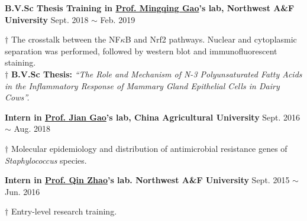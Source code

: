\vspace{5pt}


\textbf{B.V.Sc Thesis Training in \href{https://faculty.nwu.edu.cn/gaomingqing/en/index.htm}{Prof. Mingqing Gao}'s lab, Northwest A\&F University} \hfill Sept. 2018 $\sim$ Feb. 2019

{\small
$\dagger$ The crosstalk between the NF$\kappa$B and Nrf2 pathways. Nuclear and cytoplasmic separation was performed, followed by western blot and immunofluorescent staining.\\
$\dagger$ \textbf{B.V.Sc Thesis:} \textit{``The Role and Mechanism of N-3 Polyunsaturated Fatty Acids in the Inflammatory Response of Mammary Gland Epithelial Cells in Dairy Cows''.}
}


\vspace{5pt}


\textbf{Intern in \href{https://cvm.cau.edu.cn/art/2017/9/12/art_41957_71.html}{Prof. Jian Gao}'s lab, China Agricultural University} \hfill Sept. 2016 $\sim$ Aug. 2018

{\small
$\dagger$ Molecular epidemiology and distribution of antimicrobial resistance genes of \textit{Staphylococcus} species\cite{zhao2018detection,qu2019molecular}.
}

\vspace{5pt}

\textbf{Intern in \href{https://dyxy.nwsuaf.edu.cn/en/People/FullProfessor/5e6012bf013a499c946289472b285795.htm}{Prof. Qin Zhao}'s lab. Northwest A\&F University} \hfill Sept. 2015 $\sim$ Jun. 2016

{\small
$\dagger$ Entry-level research training.
}